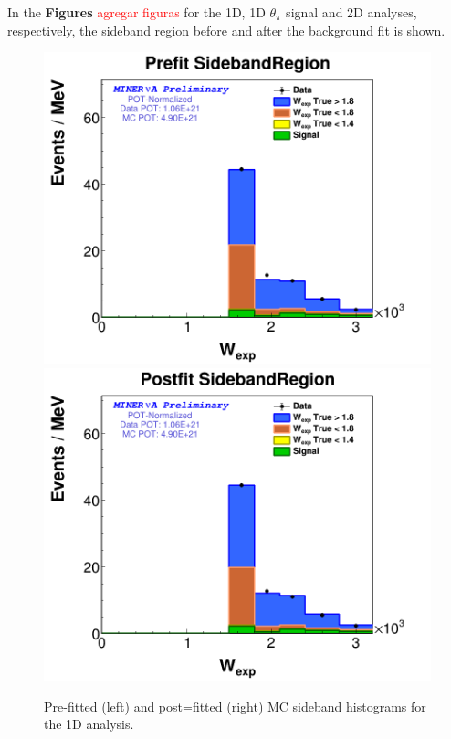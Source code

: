In the \textbf{Figures} \textcolor{red}{agregar figuras} for the 1D, 1D $\theta_\pi$ signal and 2D analyses, respectively, the sideband region before and after the background fit is shown. 

\begin{figure}
    \centering
    \includegraphics[scale=0.2]{Figures/Chapter4/BGStudies/PreWFit_wexp_fit_1Pi_PN_SidebandRegion_1DAnalysis.png}
    \includegraphics[scale=0.2]{Figures/Chapter4/BGStudies/PostWFit_wexp_fit_1Pi_PN_SidebandRegion_1DAnalysis.png}
    \caption{Pre-fitted (left) and post=fitted (right) MC sideband histograms for the 1D analysis.}
    \label{fig:BgStudies:SidebandTunning:PrePosFit1DAnalysis}
\end{figure}


